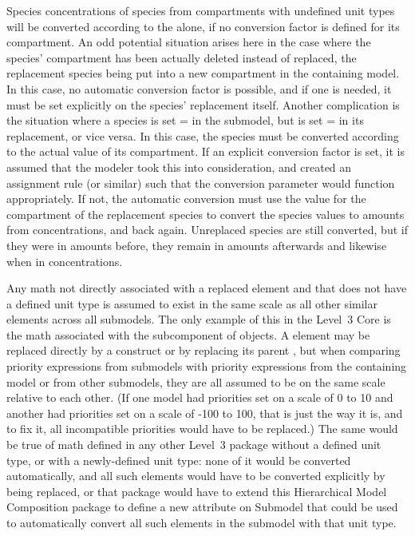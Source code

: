 Species concentrations of species from compartments with undefined unit
types will be converted according to the
 alone, if no conversion factor is
defined for its compartment.  An odd potential situation arises here in
the case where the species' compartment has been actually deleted
instead of replaced, the replacement species being put into a new
compartment in the containing model.  In this case, no automatic
conversion factor is possible, and if one is needed, it must be set
explicitly on the species' replacement itself.  Another complication is
the situation where a species is set
= in the submodel, but is set
= in its replacement, or vice
versa.  In this case, the species must be converted according to the
actual value of its compartment.  If an explicit conversion factor is
set, it is assumed that the modeler took this into consideration, and
created an assignment rule (or similar) such that the conversion
parameter would function appropriately.  If not, the automatic
conversion must use the value for the compartment of the replacement
species to convert the species values to amounts from concentrations,
and back again.  Unreplaced species are still converted, but if they
were in amounts before, they remain in amounts afterwards and likewise
when in concentrations.

Any math not directly associated with a replaced element and that does
not have a defined unit type is assumed to exist in the same scale as
all other similar elements across all submodels.  The only example of
this in the Level~3 Core is the math associated with the \Priority
subcomponent of \Event objects.  A \Priority element may be replaced
directly by a \ReplacedElement construct or by replacing its parent
\Event, but when comparing priority expressions from submodels with
priority expressions from the containing model or from other submodels,
they are all assumed to be on the same scale relative to each other.
(If one model had priorities set on a scale of 0 to 10 and another had
priorities set on a scale of -100 to 100, that is just the way it is,
and to fix it, all incompatible priorities would have to be replaced.)
The same would be true of math defined in any other Level~3 package
without a defined unit type, or with a newly-defined unit type: none of
it would be converted automatically, and all such elements would have to
be converted explicitly by being replaced, or that package would have to
extend this Hierarchical Model Composition package to define a new
attribute on Submodel that could be used to automatically convert all
such elements in the submodel with that unit type.


